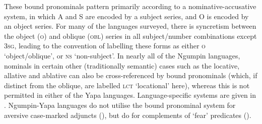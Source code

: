 \documentclass[output=paper,colorlinks,citecolor=brown]{langscibook}
\begin{document}
These bound pronominals pattern primarily according to a nominative-accusative system, in which A and S are encoded by a subject series, and O is encoded by an object series. For many of the languages surveyed, there is syncretism between the object (\textsc{o})  and oblique (\textsc{obl}) series in all subject/number combinations except \textsc{3sg}, leading to the convention of labelling these forms as either \textsc{o} `object/oblique', or \textsc{ns} `non-subject'. In nearly all of the Ngumpin languages, nominals in certain other (traditionally semantic) cases such as the locative, allative and ablative can also be cross-referenced by bound pronominals (which, if distinct from the oblique, are labelled \textsc{lct} `locational' here), whereas this is not permitted in either of the Yapa languages. Language-specific systems are given in . Ngumpin-Yapa languages do not utilise the bound pronominal system for aversive case-marked adjuncts (), but do for complements of `fear' predicates ().
\end{document}

